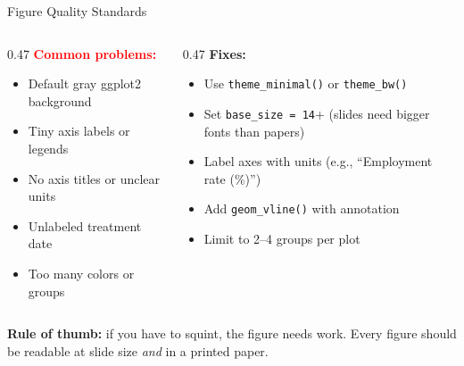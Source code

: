 \begin{frame}{Figure Quality Standards}
  \begin{columns}[T]
    \begin{column}{0.47\textwidth}
      \textbf{\textcolor{red}{Common problems:}}
      \begin{itemize}
        \item Default gray ggplot2 background
        \item Tiny axis labels or legends
        \item No axis titles or unclear units
        \item Unlabeled treatment date
        \item Too many colors or groups
      \end{itemize}
    \end{column}
    \begin{column}{0.47\textwidth}
      \textbf{\textcolor{usfgreen}{Fixes:}}
      \begin{itemize}
        \item Use \texttt{theme\_minimal()} or \texttt{theme\_bw()}
        \item Set \texttt{base\_size = 14}+ (slides need bigger fonts than papers)
        \item Label axes with units (e.g., ``Employment rate (\%)'')
        \item Add \texttt{geom\_vline()} with annotation
        \item Limit to 2--4 groups per plot
      \end{itemize}
    \end{column}
  \end{columns}

  \vspace{8pt}

  \textbf{Rule of thumb:} if you have to squint, the figure needs work. Every figure should be readable at slide size \textit{and} in a printed paper.
\end{frame}

